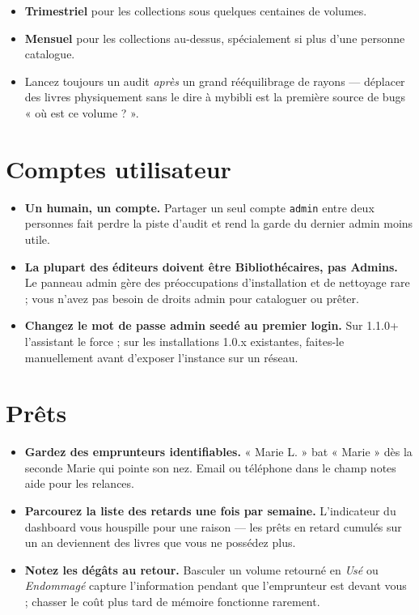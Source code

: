 \begin{itemize}
  \item \textbf{Trimestriel} pour les collections sous quelques
        centaines de volumes.
  \item \textbf{Mensuel} pour les collections au-dessus,
        spécialement si plus d'une personne catalogue.
  \item Lancez toujours un audit \emph{après} un grand
        rééquilibrage de rayons — déplacer des livres
        physiquement sans le dire à mybibli est la première
        source de bugs « où est ce volume ? ».
\end{itemize}

\section{Comptes utilisateur}

\begin{itemize}
  \item \textbf{Un humain, un compte.} Partager un seul compte
        \texttt{admin} entre deux personnes fait perdre la piste
        d'audit et rend la garde du dernier admin moins utile.
  \item \textbf{La plupart des éditeurs doivent être
        Bibliothécaires, pas Admins.} Le panneau admin gère des
        préoccupations d'installation et de nettoyage rare ; vous
        n'avez pas besoin de droits admin pour cataloguer ou
        prêter.
  \item \textbf{Changez le mot de passe admin seedé au premier
        login.} Sur 1.1.0+ l'assistant le force ; sur les
        installations 1.0.x existantes, faites-le manuellement
        avant d'exposer l'instance sur un réseau.
\end{itemize}

\section{Prêts}

\begin{itemize}
  \item \textbf{Gardez des emprunteurs identifiables.} « Marie L. »
        bat « Marie » dès la seconde Marie qui pointe son nez.
        Email ou téléphone dans le champ notes aide pour les
        relances.
  \item \textbf{Parcourez la liste des retards une fois par
        semaine.} L'indicateur du dashboard vous houspille pour
        une raison — les prêts en retard cumulés sur un an
        deviennent des livres que vous ne possédez plus.
  \item \textbf{Notez les dégâts au retour.} Basculer un volume
        retourné en \emph{Usé} ou \emph{Endommagé} capture
        l'information pendant que l'emprunteur est devant vous ;
        chasser le coût plus tard de mémoire fonctionne rarement.
\end{itemize}

